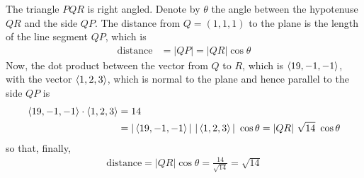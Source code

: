 \begin{eg}
The triangle $PQR$ is right angled. Denote by $\theta$
the angle between the hypotenuse $QR$ and the side $QP$.
The distance from $Q=(1,1,1)$ to the plane is the length of the 
line segment $QP$, which is
\begin{align*}
\text{distance} &= |QP| = |QR|\cos\theta
\end{align*} 
Now, the dot product between the vector from $Q$ to $R$, which is 
$\left< 19,-1,-1\right>$, with the vector $\left< 1,2,3\right>$, which is 
normal to the plane and hence parallel to the side $QP$ is
\begin{align*}
 \left< 19,-1,-1\right>\cdot \left< 1,2,3\right> &=14 \\
   &= |\left< 19,-1,-1\right>|\  |\left< 1,2,3\right>|\ \cos\theta
   = |QR|\  \sqrt{14}\ \cos\theta
\end{align*}
so that, finally,
\begin{align*}
\text{distance} = |QR|\cos\theta =\frac{14}{\sqrt{14}}=\sqrt{14}
\end{align*}

\end{eg}

